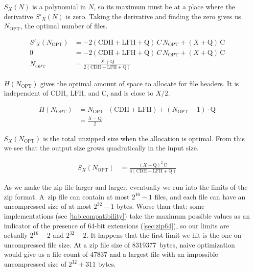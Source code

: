 \documentclass[letterpaper,twocolumn,10pt]{article}
\newcommand{\CDH}{\mathrm{CDH}}
\newcommand{\LFH}{\mathrm{LFH}}
\newcommand{\Q}{\mathrm{Q}}
\newcommand{\C}{\mathrm{C}}
\newcommand{\OPT}{\mathrm{OPT}}
\begin{document}
$S_X(N)$
is a polynomial in $N$,
so its maximum must be at a place where the derivative
$S'_X(N)$
is zero.
Taking the derivative and finding the zero gives us
$N_\OPT$,
the optimal number of files.

\begin{align*}
S'_X(N_\OPT) &= - 2 (\CDH + \LFH + \Q) \, C \, N_\OPT + (X + \Q) \, \C \\
           0 &= - 2 (\CDH + \LFH + \Q) \, C \, N_\OPT + (X + \Q) \, \C \\
     N_\OPT  &= \frac{X + \Q}{2 (\CDH + \LFH + \Q)}
\end{align*}

$H(N_\OPT)$
gives the optimal amount of space to allocate for file headers.
It is independent of $\CDH$, $\LFH$, and $\C$,
and is close to $X/2$.

\begin{align*}
H(N_\OPT) &= N_\OPT\cdot(\CDH + \LFH) + (N_\OPT - 1)\cdot\Q \\
          &= \frac{X - \Q}{2}
\end{align*}

$S_X(N_\OPT)$
is the total unzipped size
when the allocation is optimal.
From this we see that the output size grows quadratically
in the input size.

\begin{align}
\label{eq:opt}
S_X(N_\OPT) &= \frac{(X + \Q)^2 \, \C}{4(\CDH + \LFH + \Q)}
\end{align}

As we make the zip file larger and larger,
eventually we run into the limits of the zip format.
A~zip file can contain at most $2^{16}-1$ files,
and each file can have an uncompressed size of at most $2^{32}-1$ bytes.
Worse than that:
some implementations (see \autoref{tab:compatibility})
take the maximum possible values
as an indicator of the presence of 64-bit extensions (\autoref{sec:zip64}),
so our limits are actually $2^{16}-2$ and $2^{32}-2$.
It happens that the first limit we hit is the one on uncompressed file size.
At a zip file size of \SI{8319377}{bytes},
naive optimization would give us a file count of \num{47837}
and a largest file with an impossible uncompressed size of
$2^{32}+311$ bytes.
% 
% 
\end{document}
